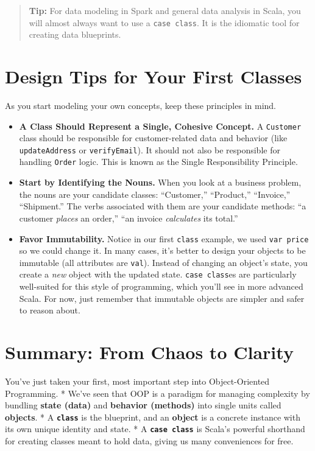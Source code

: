 \documentclass[
  letterpaper,
  DIV=11,
  numbers=noendperiod]{scrreprt}
\providecommand{\tightlist}{%
  \setlength{\itemsep}{0pt}\setlength{\parskip}{0pt}}
\begin{document}
\begin{quote}
\textbf{Tip:} For data modeling in Spark and general data analysis in
Scala, you will almost always want to use a \texttt{case\ class}. It is
the idiomatic tool for creating data blueprints.
\end{quote}

\section{Design Tips for Your First
Classes}\label{design-tips-for-your-first-classes}

As you start modeling your own concepts, keep these principles in mind.

\begin{itemize}
\tightlist
\item
  \textbf{A Class Should Represent a Single, Cohesive Concept.} A
  \texttt{Customer} class should be responsible for customer-related
  data and behavior (like \texttt{updateAddress} or
  \texttt{verifyEmail}). It should not also be responsible for handling
  \texttt{Order} logic. This is known as the Single Responsibility
  Principle.
\item
  \textbf{Start by Identifying the Nouns.} When you look at a business
  problem, the nouns are your candidate classes: ``Customer,''
  ``Product,'' ``Invoice,'' ``Shipment.'' The verbs associated with them
  are your candidate methods: ``a customer \emph{places} an order,''
  ``an invoice \emph{calculates} its total.''
\item
  \textbf{Favor Immutability.} Notice in our first \texttt{class}
  example, we used \texttt{var\ price} so we could change it. In many
  cases, it's better to design your objects to be immutable (all
  attributes are \texttt{val}). Instead of changing an object's state,
  you create a \emph{new} object with the updated state.
  \texttt{case\ class}es are particularly well-suited for this style of
  programming, which you'll see in more advanced Scala. For now, just
  remember that immutable objects are simpler and safer to reason about.
\end{itemize}

\section{Summary: From Chaos to
Clarity}\label{summary-from-chaos-to-clarity}

You've just taken your first, most important step into Object-Oriented
Programming. * We've seen that OOP is a paradigm for managing complexity
by bundling \textbf{state (data)} and \textbf{behavior (methods)} into
single units called \textbf{objects}. * A \textbf{\texttt{class}} is the
blueprint, and an \textbf{object} is a concrete instance with its own
unique identity and state. * A \textbf{\texttt{case\ class}} is Scala's
powerful shorthand for creating classes meant to hold data, giving us
many conveniences for free.
\end{document}
